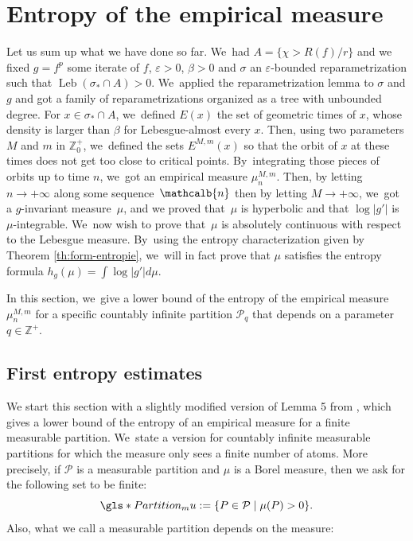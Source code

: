 \documentclass[10pt]{amsart}
\DeclareMathOperator{\Leb}{Leb}
\newcommand{\mcbn}{{\mathcalb{n}}}
\theoremstyle{definition}
\newcommand{\bbZ}{{\mathbb{Z}}}
\begin{document}
\section{Entropy of the empirical measure}
\label{sec:entropie}

Let us sum up what we have done so far. We~had $A = \{ \chi > R(f) / r \}$ and we fixed $g = f^p$ some iterate of $f$, $\varepsilon > 0$, $\beta > 0$ and $\sigma$ an $\varepsilon$-bounded reparametrization such that $\Leb(\sigma_* \cap A) > 0$. We~applied the reparametrization lemma to $\sigma$ and $g$ and got a family of reparametrizations organized as a tree with unbounded degree.
For $x \in \sigma_* \cap A$, we~defined $E(x)$ the set of geometric times of $x$, whose density is larger than $\beta$ for Lebesgue-almost every $x$.
Then, using two parameters $M$ and $m$ in $\bbZ_0^+$, we~defined the sets $E^{M,m}(x)$ so that the orbit of $x$ at these times does not get too close to critical points. By~integrating those pieces of orbits up to time $n$, we~got an empirical measure $\mu_n^{M,m}$.
Then, by letting $n \to +\infty$ along some sequence~$\mcbn$ then by letting $M \to +\infty$, we~got a $g$-invariant measure~$\mu$, and we proved that~$\mu$ is hyperbolic and that $\log |g'|$ is $\mu$-integrable. We~now wish to prove that~$\mu$ is absolutely continuous with respect to the Lebesgue measure. By~using the entropy characterization given by Theorem \ref{th:form-entropie}, we~will in fact prove that $\mu$ satisfies the entropy formula $h_g(\mu) = \int \log |g'| d \mu$.

In this section, we~give a lower bound of the entropy of the empirical measure $\mu_n^{M,m}$ for a specific countably infinite partition $\mathcal{P}_q$ that depends on a parameter $q \in \bbZ^+$.

\subsection{First entropy estimates}
\label{ssec:entropie1}

We start this section with a slightly modified version of Lemma 5 from \cite{MR4701884}, which gives a lower bound of the entropy of an empirical measure for a finite measurable partition. We~state a version for countably infinite measurable partitions for which the measure only sees a finite number of atoms. More precisely, if $\mathcal{P}$ is a measurable partition and $\mu$ is a Borel measure, then we ask for the following set to be finite:
\[
\gls*{Partition_mu} := \{ P \in \mathcal{P} \mid \mu(P) > 0 \}.
\]
Also, what we call a measurable partition depends on the measure:
\end{document}
